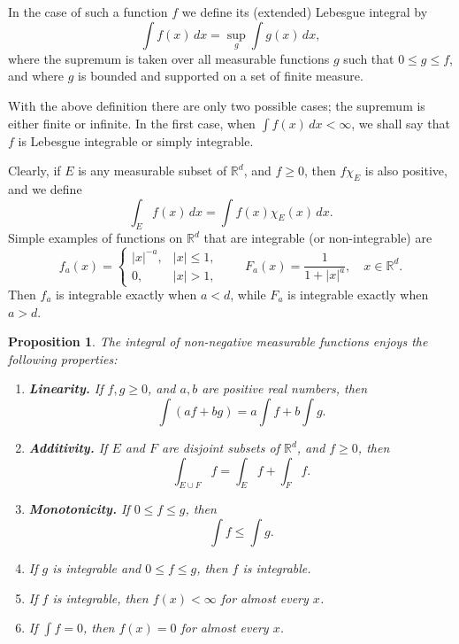 \documentclass[11pt,openany]{book}
\newtheorem{proposition}[theorem]{Proposition}
\begin{document}
In the case of such a function $f$ we define its (extended) Lebesgue integral by
\[
\int f(x)\,dx=\sup_g\int g(x)\,dx,
\]
where the supremum is taken over all measurable functions $g$ such that $0\leq g\leq f$, and where $g$ is bounded and supported on a set of finite measure.

With the above definition there are only two possible cases; the supremum is either finite or infinite. In the first case, when $\int f(x)\,dx<\infty$, we shall say that $f$ is Lebesgue integrable or simply integrable.

Clearly, if $E$ is any measurable subset of $\mathbb{R}^d$, and $f\geq0$, then $f\chi_E$ is also positive, and we define
\[
\int_E f(x)\,dx=\int f(x)\chi_E(x)\,dx.
\]
Simple examples of functions on $\mathbb{R}^d$ that are integrable (or non-integrable) are
\[
f_a(x)=
\begin{cases}
|x|^{-a},&|x|\leq1,\\
0,&|x|>1,
\end{cases}
\qquad
F_a(x)=\frac{1}{1+|x|^a},\quad x\in\mathbb{R}^d.
\]
Then $f_a$ is integrable exactly when $a<d$, while $F_a$ is integrable exactly when $a>d$.

\begin{proposition}
The integral of non-negative measurable functions enjoys the following properties:
\begin{enumerate}
\item[(i)] \textbf{Linearity.} If $f,g\geq0$, and $a,b$ are positive real numbers, then
\[
\int(af+bg)=a\int f+b\int g.
\]
\item[(ii)] \textbf{Additivity.} If $E$ and $F$ are disjoint subsets of $\mathbb{R}^d$, and $f\geq0$, then
\[
\int_{E\cup F}f=\int_Ef+\int_Ff.
\]
\item[(iii)] \textbf{Monotonicity.} If $0\leq f\leq g$, then
\[
\int f\leq\int g.
\]
\item[(iv)] If $g$ is integrable and $0\leq f\leq g$, then $f$ is integrable.
\item[(v)] If $f$ is integrable, then $f(x)<\infty$ for almost every $x$.
\item[(vi)] If $\int f=0$, then $f(x)=0$ for almost every $x$.
\end{enumerate}
\end{proposition}
\end{document}
